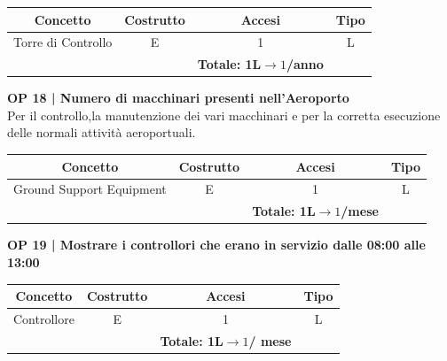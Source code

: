 \begin{tabular}{ c c c c}
	\hline
	\rowcolor{airforceblue}
	\textbf{\color{white}Concetto} & \textbf{\color{white}Costrutto} & \textbf{\color{white}Accesi} & \textbf{\color{white}Tipo}\\
	\hline
	\textsf{\small Torre di Controllo} & \textsf{\small E} & \textsf{\small 1} &  \textsf{\small L}\\
	\hline
	\rowcolor{airforceblue}
	\textsf{\small } & \textsf{\small } & \textbf{\color{white}Totale: 1L$\rightarrow 1$/anno } \textsf{\small } & \textsf{\small }\\
	\hline
\end{tabular}

\vspace{.6cm}


\textbf{\small OP 18 | Numero di macchinari presenti nell'Aeroporto}\\

\textsf{\small Per il controllo,la manutenzione dei vari macchinari e per la corretta esecuzione delle normali attività aeroportuali.}\break

\begin{tabular}{ c c c c}
	\hline
	\rowcolor{airforceblue}
	\textbf{\color{white}Concetto} & \textbf{\color{white}Costrutto} & \textbf{\color{white}Accesi} & \textbf{\color{white}Tipo}\\
	\hline
	\textsf{\small Ground Support Equipment } & \textsf{\small E} & \textsf{\small 1} &  \textsf{\small L}\\
	\hline
	\rowcolor{airforceblue}
	\textsf{\small } & \textsf{\small } & \textbf{\color{white}Totale: 1L$\rightarrow 1$/mese } \textsf{\small } & \textsf{\small }\\
	\hline
\end{tabular}

\vspace{.6cm}


\textbf{\small OP 19 | Mostrare i controllori che erano in servizio dalle 08:00 alle 13:00}\\

\begin{tabular}{ c c c c}
	\hline
	\rowcolor{airforceblue}
	\textbf{\color{white}Concetto} & \textbf{\color{white}Costrutto} & \textbf{\color{white}Accesi} & \textbf{\color{white}Tipo}\\
	\hline
	\textsf{\small Controllore} & \textsf{\small E} & \textsf{\small 1} &  \textsf{\small L}\\
	\hline
	\rowcolor{airforceblue}
	\textsf{\small } & \textsf{\small } & \textbf{\color{white}Totale: 1L$\rightarrow 1$/ mese} \textsf{\small } & \textsf{\small }\\
	\hline
\end{tabular}

